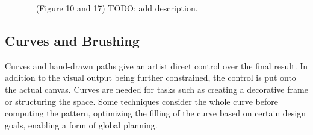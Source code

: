 \begin{figure}[H]
    \centering
    \label{fig:hsu_2020_aef}
    \caption{\citeauthor*{hsu_2020_aef}~\cite{hsu_2020_aef} (Figure 10 and 17) TODO: add description. \color{red}{Status rights: not started.}}
\end{figure}


\subsection{Curves and Brushing}
\label{subsubsec:analysis_creative_means_curves}

Curves and hand-drawn paths give an artist direct control over the final result. In addition to the visual output being further constrained, the control is put onto the actual canvas. Curves are needed for tasks such as creating a decorative frame or structuring the space. Some techniques consider the whole curve before computing the pattern, optimizing the filling of the curve based on certain design goals, enabling a form of global planning.

